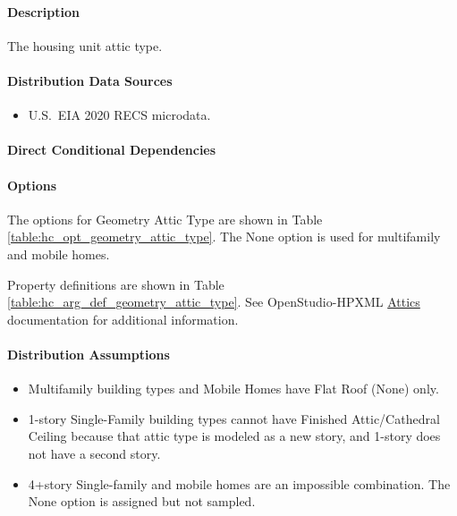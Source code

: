 \paragraph{Description}
% 
The housing unit attic type.

\paragraph{Distribution Data Sources}
% 
\begin{itemize}
    \item U.S.~EIA 2020 RECS microdata.
\end{itemize}

\paragraph{Direct Conditional Dependencies}


\paragraph{Options}
The options for Geometry Attic Type are shown in Table \ref{table:hc_opt_geometry_attic_type}. The None option is used for multifamily and mobile homes.



Property definitions are shown in Table \ref{table:hc_arg_def_geometry_attic_type}. See OpenStudio-HPXML \href{https://openstudio-hpxml.readthedocs.io/en/v1.10.0/workflow_inputs.html#hpxml-attics}{Attics} documentation for additional information.



\paragraph{Distribution Assumptions}
% 
\begin{itemize}
    \item Multifamily building types and Mobile Homes have Flat Roof (None) only.
    \item 1-story Single-Family building types cannot have Finished Attic/Cathedral Ceiling because that attic type is modeled as a new story, and 1-story does not have a second story.
    \item 4+story Single-family and mobile homes are an impossible combination. The None option is assigned but not sampled.
\end{itemize}

